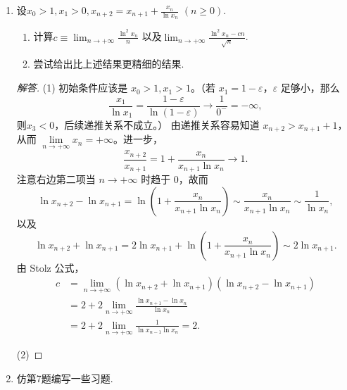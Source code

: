 \begin{6b}
\begin{enumerate}
\begin{proof}
取 $y=0$，即得：对任何 $|x|<\delta$，$0=g(x,0)=f(x)+f(-x)$，亦即 $f(-x)=-f(x)$。进而，
$$f(x+y)=f(x)+f(y), \quad \forall\,x,y\in(-\delta,\delta).$$
根据 $f$ 在 $(-\delta, \delta)$ 内的连续性和 $\lim\limits_{x \rightarrow 0} f(x)/x=1$ 容易得到 $f(x)=x$。
\end{proof}
\item 设\(x_0>1,x_1>0,x_{n+2}=x_{n+1}+\frac{x_n}{\ln x_n}\) \((n\geqslant 0)\).
\begin{enumerate}[label=(\arabic*)]
\item 计算\(c\equiv\lim_{n\rightarrow+\infty}\frac{\ln^2x_n}{n}\)
以及\(\lim_{n\rightarrow+\infty}\frac{\ln^2x_n-cn}{\sqrt{n}}\).
\item 尝试给出比上述结果更精细的结果.
\end{enumerate}
\begin{proof}[解答]
(1) 初始条件应该是 $x_0>1, x_1>1$。（若 $x_1=1-\varepsilon$，$\varepsilon$ 足够小，那么
\[\frac{x_1}{\ln x_1}=\frac{1-\varepsilon}{\ln(1-\varepsilon)}\to\frac{1}{0^-}=-\infty,\]
则$x_3<0$，后续递推关系不成立。）
由递推关系容易知道 $x_{n+2}>x_{n+1}+1$，从而 $\lim\limits_{n\to+\infty}x_n=+\infty$。进一步，
$$\frac{x_{n+2}}{x_{n+1}}=1+\frac{x_n}{x_{n+1} \ln x_n} \rightarrow 1.$$
注意右边第二项当 $n\rightarrow+\infty$ 时趋于 $0$，故而
$$\ln x_{n+2}-\ln x_{n+1}=\ln \left(1+\frac{x_n}{x_{n+1} \ln x_n}\right) 
\sim \frac{x_n}{x_{n+1} \ln x_n} \sim \frac{1}{\ln x_n},$$
以及
$$\ln x_{n+2}+\ln x_{n+1}=2\ln x_{n+1}+\ln \left(1+\frac{x_n}{x_{n+1} \ln x_n}\right) \sim 2\ln x_{n+1}.$$
由 Stolz 公式，
\begin{align*}
c & =\lim_{n\to+\infty}(\ln x_{n+2}+\ln x_{n+1})(\ln x_{n+2}-\ln x_{n+1})\\
& =2+2\lim_{n\to+\infty}\frac{\ln x_{n+1}-\ln x_n}{\ln x_n}\\
& =2+2\lim_{n\to+\infty}\frac{1}{\ln x_{n-1} \ln x_n}=2.
\end{align*}

(2)
\end{proof}
\item 仿第7题编写一些习题.
\end{enumerate}
\end{6b}